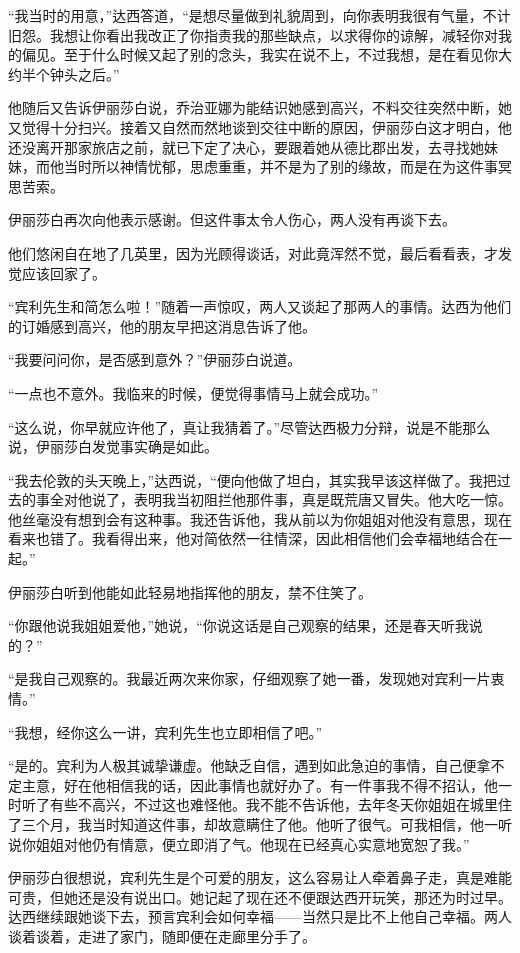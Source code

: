 \par “我当时的用意，”达西答道，“是想尽量做到礼貌周到，向你表明我很有气量，不计旧怨。我想让你看出我改正了你指责我的那些缺点，以求得你的谅解，减轻你对我的偏见。至于什么时候又起了别的念头，我实在说不上，不过我想，是在看见你大约半个钟头之后。”
\par 他随后又告诉伊丽莎白说，乔治亚娜为能结识她感到高兴，不料交往突然中断，她又觉得十分扫兴。接着又自然而然地谈到交往中断的原因，伊丽莎白这才明白，他还没离开那家旅店之前，就已下定了决心，要跟着她从德比郡出发，去寻找她妹妹，而他当时所以神情忧郁，思虑重重，并不是为了别的缘故，而是在为这件事冥思苦索。
\par 伊丽莎白再次向他表示感谢。但这件事太令人伤心，两人没有再谈下去。
\par 他们悠闲自在地了几英里，因为光顾得谈话，对此竟浑然不觉，最后看看表，才发觉应该回家了。
\par “宾利先生和简怎么啦！”随着一声惊叹，两人又谈起了那两人的事情。达西为他们的订婚感到高兴，他的朋友早把这消息告诉了他。
\par “我要问问你，是否感到意外？”伊丽莎白说道。
\par “一点也不意外。我临来的时候，便觉得事情马上就会成功。”
\par “这么说，你早就应许他了，真让我猜着了。”尽管达西极力分辩，说是不能那么说，伊丽莎白发觉事实确是如此。
\par “我去伦敦的头天晚上，”达西说，“便向他做了坦白，其实我早该这样做了。我把过去的事全对他说了，表明我当初阻拦他那件事，真是既荒唐又冒失。他大吃一惊。他丝毫没有想到会有这种事。我还告诉他，我从前以为你姐姐对他没有意思，现在看来也错了。我看得出来，他对简依然一往情深，因此相信他们会幸福地结合在一起。”
\par 伊丽莎白听到他能如此轻易地指挥他的朋友，禁不住笑了。
\par “你跟他说我姐姐爱他，”她说，“你说这话是自己观察的结果，还是春天听我说的？”
\par “是我自己观察的。我最近两次来你家，仔细观察了她一番，发现她对宾利一片衷情。”
\par “我想，经你这么一讲，宾利先生也立即相信了吧。”
\par “是的。宾利为人极其诚挚谦虚。他缺乏自信，遇到如此急迫的事情，自己便拿不定主意，好在他相信我的话，因此事情也就好办了。有一件事我不得不招认，他一时听了有些不高兴，不过这也难怪他。我不能不告诉他，去年冬天你姐姐在城里住了三个月，我当时知道这件事，却故意瞒住了他。他听了很气。可我相信，他一听说你姐姐对他仍有情意，便立即消了气。他现在已经真心实意地宽恕了我。”
\par 伊丽莎白很想说，宾利先生是个可爱的朋友，这么容易让人牵着鼻子走，真是难能可贵，但她还是没有说出口。她记起了现在还不便跟达西开玩笑，那还为时过早。达西继续跟她谈下去，预言宾利会如何幸福——当然只是比不上他自己幸福。两人谈着谈着，走进了家门，随即便在走廊里分手了。




